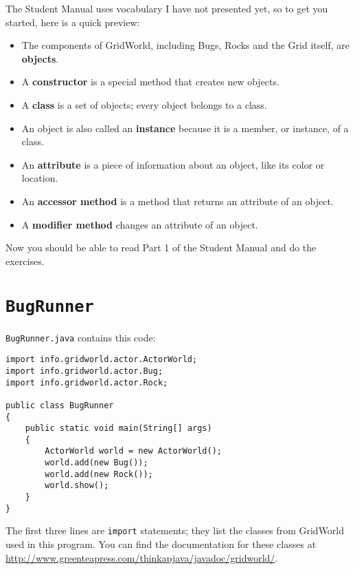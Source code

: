 \documentclass[12pt]{book}
\theoremstyle{definition}
\begin{document}
The Student Manual uses vocabulary I have not presented yet, so to
get you started, here is a quick preview:

\begin{itemize}

\item The components of GridWorld, including Bugs, Rocks and the Grid
itself, are {\bf objects}.

\item A {\bf constructor} is a special method that creates new objects.

\item A {\bf class} is a set of objects; every object belongs to a
class.

\item An object is also called an {\bf instance} because it is a member,
or instance, of a class.

\item An {\bf attribute} is a piece of information about an object, like
its color or location.

\item An {\bf accessor method} is a method that returns an attribute of
an object.

\item A {\bf modifier method} changes an attribute of an object.

\end{itemize}

Now you should be able to read Part 1 of the Student Manual and do
the exercises.

\section{{\tt BugRunner}}

{\tt BugRunner.java} contains this code:

\begin{lstlisting}
import info.gridworld.actor.ActorWorld;
import info.gridworld.actor.Bug;
import info.gridworld.actor.Rock;

public class BugRunner
{
    public static void main(String[] args)
    {
        ActorWorld world = new ActorWorld();
        world.add(new Bug());
        world.add(new Rock());
        world.show();
    }
}
\end{lstlisting}

The first three lines are {\tt import} statements; they list the
classes from GridWorld used in this program.  You can find the
documentation for these classes at
\url{http://www.greenteapress.com/thinkapjava/javadoc/gridworld/}.
\end{document}
